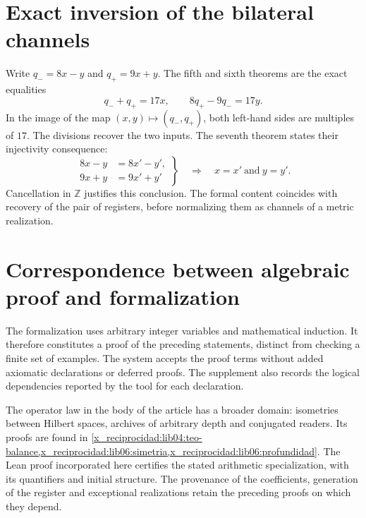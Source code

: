 \section*{Exact inversion of the bilateral channels}

Write \(q_-=8x-y\) and \(q_+=9x+y\). The fifth and sixth theorems
are the exact equalities
\[
 q_-+q_+=17x,\qquad 8q_+-9q_-=17y.
\]
In the image of the map \((x,y)\mapsto(q_-,q_+)\), both left-hand
sides are multiples of \(17\). The divisions recover the two
inputs. The seventh theorem states their injectivity consequence:
\[
 \left.
 \begin{aligned}
 8x-y&=8x'-y',\\
 9x+y&=9x'+y'
 \end{aligned}
 \right\}
 \quad\Longrightarrow\quad x=x'\ \text{and}\ y=y'.
\]
Cancellation in \(\mathbb Z\) justifies this conclusion. The formal
content coincides with recovery of the pair of registers, before
normalizing them as channels of a metric realization.

\section*{Correspondence between algebraic proof and formalization}

The formalization uses arbitrary integer variables and mathematical
induction. It therefore constitutes a proof of the preceding statements,
distinct from checking a finite set of examples. The system
accepts the proof terms without added axiomatic declarations or
deferred proofs. The supplement also records the logical
dependencies reported by the tool for each declaration.

The operator law in the body of the article has a broader domain:
isometries between Hilbert spaces, archives of arbitrary depth and
conjugated readers. Its proofs are found in
\cref{x_reciprocidad:lib04:teo-balance,x_reciprocidad:lib06:simetria,x_reciprocidad:lib06:profundidad}. The Lean proof
incorporated here certifies the stated arithmetic specialization, with
its quantifiers and initial structure. The provenance of the
coefficients, generation of the register and exceptional realizations
retain the preceding proofs on which they depend.
